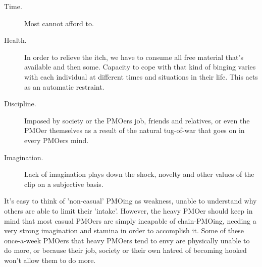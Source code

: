 \documentclass[easypeasy]{subfiles}
\begin{document}
  \begin{description}
  \item [Time.] Most cannot afford to.
  \item [Health.] In order to relieve the itch, we have to consume all free material that's available and then some. Capacity to cope with that kind of binging varies with each individual at different times and situations in their life. This acts as an automatic restraint.
  \item [Discipline.] Imposed by society or the PMOers job, friends and relatives, or even the PMOer themselves as a result of the natural tug-of-war that goes on in every PMOers mind.
  \item [Imagination.] Lack of imagination plays down the shock, novelty and other values of the clip on a subjective basis.
  \end{description}

It's easy to think of 'non-casual' PMOing as weakness, unable to understand why others are able to limit their 'intake'. However, the heavy PMOer should keep in mind that most casual PMOers are simply incapable of chain-PMOing, needing a very strong imagination and stamina in order to accomplish it. Some of these once-a-week PMOers that heavy PMOers tend to envy are physically unable to do more, or because their job, society or their own hatred of becoming hooked won't allow them to do more.
\end{document}

